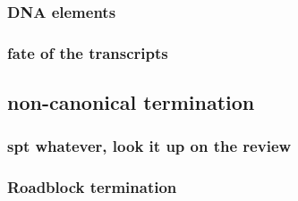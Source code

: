 \subsubsection{DNA elements}
\subsubsection{fate of the transcripts}
\subsection{non-canonical termination}
\subsubsection{spt whatever, look it up on the review}
\subsubsection{Roadblock termination}